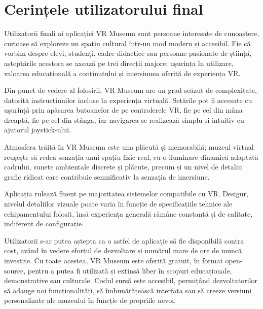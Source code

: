 \section{Cerințele utilizatorului final}

Utilizatorii finali ai aplicației VR Museum sunt persoane interesate de cunoaștere, curioase să exploreze un spațiu cultural într-un mod modern și accesibil. Fie că vorbim despre elevi, studenți, cadre didactice sau persoane pasionate de știință, așteptările acestora se axează pe trei direcții majore: ușurința în utilizare, valoarea educațională a conținutului și imersiunea oferită de experiența VR.

Din punct de vedere al folosirii, VR Museum are un grad scăzut de complexitate, datorită instrucțiunilor incluse în experiența virtuală. Setările pot fi accesate cu ușurință prin apăsarea butoanelor de pe controlerele VR, fie pe cel din mâna dreaptă, fie pe cel din stânga, iar navigarea se realizează simplu și intuitiv cu ajutorul joystick-ului.

Atmosfera trăită în VR Museum este una plăcută și memorabilă; muzeul virtual reușește să redea senzația unui spațiu fizic real, cu o iluminare dinamică adaptată cadrului, sunete ambientale discrete și plăcute, precum și un nivel de detaliu grafic ridicat care contribuie semnificativ la senzația de imersiune.

Aplicația rulează fluent pe majoritatea sistemelor compatibile cu VR. Desigur, nivelul detaliilor vizuale poate varia în funcție de specificațiile tehnice ale echipamentului folosit, însă experiența generală rămâne constantă și de calitate, indiferent de configurație.

Utilizatorii s-ar putea aștepta ca o astfel de aplicație să fie disponibilă contra cost, având în vedere efortul de dezvoltare și numărul mare de ore de muncă investite. Cu toate acestea, VR Museum este oferită gratuit, în format open-source, pentru a putea fi utilizată și extinsă liber în scopuri educaționale, demonstrative sau culturale. Codul sursă este accesibil, permițând dezvoltatorilor să adauge noi funcționalități, să îmbunătățească interfața sau să creeze versiuni personalizate ale muzeului în funcție de propriile nevoi.